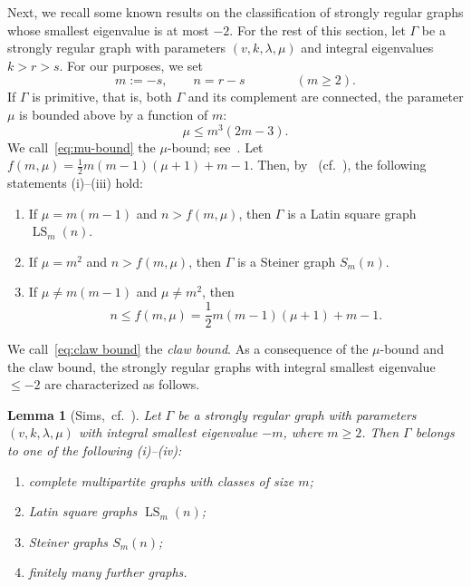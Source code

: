 \documentclass[11pt]{article}
\newtheorem{lemm}[theo]{Lemma}
\theoremstyle{definition}
\numberwithin{equation}{section}
\numberwithin{equation}{section}
\begin{document}
Next, we recall some known results on the classification of strongly regular graphs whose smallest eigenvalue is at most $-2$.
For the rest of this section, let $\Gamma$ be a strongly regular graph with parameters $(v, k, \lambda, \mu)$ and integral eigenvalues $k > r > s$.
For our purposes, we set 
\begin{equation}\label{Def:m,n}
	m := -s, \qquad n = r - s  \qquad \qquad (m \geqslant 2).
\end{equation}
If $\Gamma$ is primitive, that is, both $\Gamma$ and its complement are connected, the parameter $\mu$ is bounded above by a function of $m$:
\begin{equation}\label{eq:mu-bound}
	\mu \leqslant m^3 (2m -3).
\end{equation}
We call~\eqref{eq:mu-bound} the $\mu$-bound; see~\cite[Theorem 3.1]{Neumaier.1979}.
Let $f(m,\mu) = \frac{1}{2}m(m-1)(\mu+1) +m-1$.
Then, by~\cite[Theorem 4.7]{Neumaier.1979} (cf.~\cite[Theorem 8.6.3]{BrVM2022}), the following statements (i)--(iii) hold:
\begin{enumerate}[\normalfont(i)]
	\item If $\mu=m(m-1)$ and $n > f(m,\mu)$, then $\Gamma$ is a Latin square graph $\operatorname{LS}_m(n)$.
	\item If $\mu=m^2$ and $n > f(m,\mu)$, then $\Gamma$ is a Steiner graph $S_m(n)$.
	\item If $\mu\neq m(m-1)$ and $\mu \neq m^2$, then 
	\begin{equation}\label{eq:claw bound}
	n \leqslant f(m,\mu) = \frac{1}{2}m(m-1)(\mu+1) +m-1.
\end{equation} 
\end{enumerate}
We call~\eqref{eq:claw bound} the \emph{claw bound}.
As a consequence of the $\mu$-bound and the claw bound, the strongly regular graphs with integral smallest eigenvalue $\leqslant -2$ are characterized as follows.


\begin{lemm}[Sims,~cf.~{\cite[Theorem 8.6.4]{BrVM2022}}]\label{SRG of Sims}
Let $\Gamma$ be a strongly regular graph with parameters $(v,k,\lambda, \mu)$ with integral smallest eigenvalue $-m$, where $m\geqslant 2$. 
Then $\Gamma$ belongs to one of the following {\rm(i)}--{\rm(iv)}:
\begin{enumerate}[\normalfont(i)]
  \item complete multipartite graphs with classes of size $m$;
  \item Latin square graphs $\operatorname{LS}_m(n)$;
  \item Steiner graphs $S_m(n)$;
  \item finitely many further graphs.
\end{enumerate}
\end{lemm}
\end{document}
